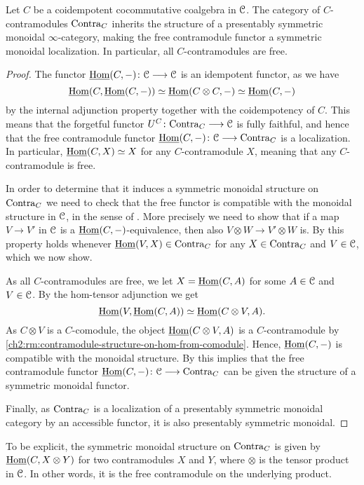 \begin{lemma}
    \label{ch2:lm:free-contra-monoidal}
    Let $C$ be a coidempotent cocommutative coalgebra in $\EuScript{C}$. The category of $C$-contramodules $\mathrm{Contra}_C$ inherits the structure of a presentably symmetric monoidal $\infty$-category, making the free contramodule functor a symmetric monoidal localization. In particular, all $C$-contramodules are free. 
\end{lemma}
\begin{proof}
    The functor $\operatorname{\underline{Hom}}(C,-)\colon \EuScript{C} \longrightarrow \EuScript{C}$ is an idempotent functor, as we have
    \[\operatorname{\underline{Hom}}(C, \operatorname{\underline{Hom}}(C,-))\simeq \operatorname{\underline{Hom}}(C\otimes C, -)\simeq \operatorname{\underline{Hom}}(C,-)\]
    by the internal adjunction property together with the coidempotency of $C$. This means that the forgetful functor $U^C\colon \mathrm{Contra}_C\longrightarrow \EuScript{C}$ is fully faithful, and hence that the free contramodule functor $\operatorname{\underline{Hom}}(C,-)\colon\EuScript{C}\longrightarrow \mathrm{Contra}_C$ is a localization. In particular, $\operatorname{\underline{Hom}}(C, X) \simeq X$ for any $C$-contramodule $X$, meaning that any $C$-contramodule is free. 
    
    In order to determine that it induces a symmetric monoidal structure on $\mathrm{Contra}_C$ we need to check that the free functor is compatible with the monoidal structure in $\EuScript{C}$, in the sense of \cite[2.2.1.7]{Lurie_HA}. More precisely we need to show that if a map $V \to V'$ in $\EuScript{C}$ is a $\operatorname{\underline{Hom}}(C,-)$-equivalence, then also $V\otimes W \to V' \otimes W$ is. By \cite[2.12(3)]{nikolaus_2016} this property holds whenever $\operatorname{\underline{Hom}}(V,X)\in \mathrm{Contra}_C$ for any $X\in \mathrm{Contra}_C$ and $V\in \EuScript{C}$, which we now show. 
    
    As all $C$-contramodules are free, we let $X = \operatorname{\underline{Hom}}(C, A)$ for some $A\in \EuScript{C}$ and $V\in \EuScript{C}$. By the hom-tensor adjunction we get 
    \[\operatorname{\underline{Hom}}(V, \operatorname{\underline{Hom}}(C, A))\simeq \operatorname{\underline{Hom}}(C\otimes V, A).\]
    As $C\otimes V$ is a $C$-comodule, the object $\operatorname{\underline{Hom}}(C\otimes V, A)$ is a $C$-contramodule by \cref{ch2:rm:contramodule-structure-on-hom-from-comodule}. Hence, $\operatorname{\underline{Hom}}(C,-)$ is compatible with the monoidal structure. By \cite[2.2.1.9]{lurie_09} this implies that the free contramodule functor $\operatorname{\underline{Hom}}(C,-)\colon \EuScript{C}\longrightarrow \mathrm{Contra}_C$ can be given the structure of a symmetric monoidal functor. 
    
    Finally, as $\mathrm{Contra}_C$ is a localization of a presentably symmetric monoidal category by an accessible functor, it is also presentably symmetric monoidal.  
\end{proof}

\begin{remark}
    To be explicit, the symmetric monoidal structure on $\mathrm{Contra}_C$ is given by $\operatorname{\underline{Hom}}(C, X\otimes Y)$ for two contramodules $X$ and $Y$, where $\otimes$ is the tensor product in $\EuScript{C}$. In other words, it is the free contramodule on the underlying product. 
\end{remark}

